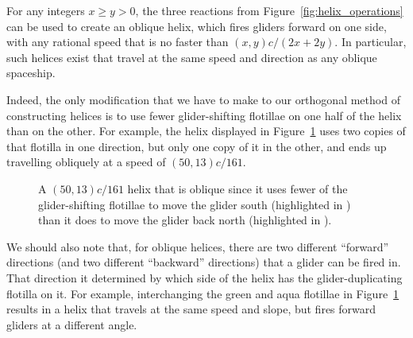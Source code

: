 \begin{theorem}\label{thm:universality_oblique_helices}
	For any integers $x \geq y > 0$, the three reactions from Figure~\ref{fig:helix_operations} can be used to create an oblique helix, which fires gliders forward on one side, with any rational speed that is no faster than $(x,y)c/(2x + 2y)$. In particular, such helices exist that travel at the same speed and direction as any oblique spaceship.
\end{theorem}

Indeed, the only modification that we have to make to our orthogonal method of constructing helices is to use fewer glider-shifting flotillae on one half of the helix than on the other. For example, the helix displayed in Figure~\ref{fig:50_13c_161_helix} uses two copies of that flotilla in one direction, but only one copy of it in the other, and ends up travelling obliquely at a speed of $(50,13)c/161$.

\begin{figure}[!htb]
	\centering
	\caption{A $(50,13)c/161$ helix that is oblique since it uses fewer of the glider-shifting flotillae to move the glider south (highlighted in ) than it does to move the glider back north (highlighted in ).}\label{fig:50_13c_161_helix}
\end{figure}

We should also note that, for oblique helices, there are two different ``forward'' directions (and two different ``backward'' directions) that a glider can be fired in. That direction it determined by which side of the helix has the glider-duplicating flotilla on it. For example, interchanging the green and aqua flotillae in Figure~\ref{fig:50_13c_161_helix} results in a helix that travels at the same speed and slope, but fires forward gliders at a different angle.

